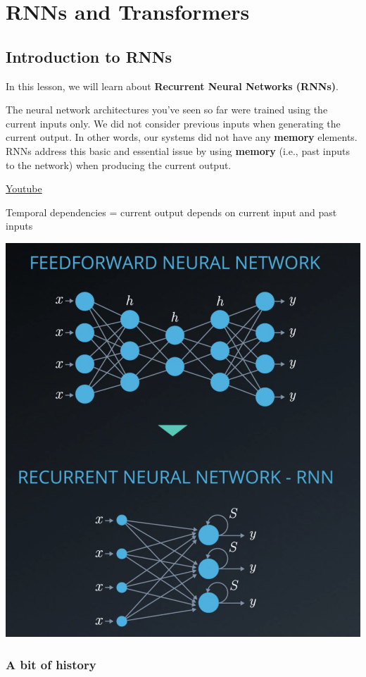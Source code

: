 \part{RNNs and Transformers}
\chapter{Introduction to RNNs}
In this lesson, we will learn about \textbf{Recurrent Neural Networks (RNNs)}. \newline

The neural network architectures you've seen so far were trained using the current inputs only. We did not consider previous inputs when generating the current output. In other words, our systems did not have any \textbf{memory} elements. RNNs address this basic and essential issue by using \textbf{memory} (i.e., past inputs to the network) when producing the current output. \newline

\href{https://www.youtube.com/watch?v=AIQEqg6F38A&t=1s&ab_channel=Udacity}{Youtube}

Temporal dependencies = current output depends on current input and past inputs 

\includegraphics[width=0.75\linewidth]{img//rnn/nn_rnn.png}

\section{A bit of history}

